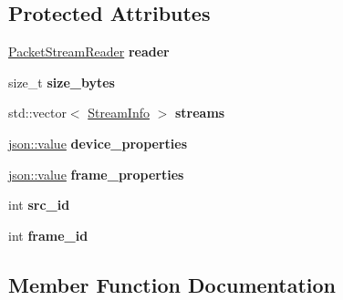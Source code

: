 \subsection*{Protected Attributes}
\begin{DoxyCompactItemize}
\item 
\hyperlink{classpangolin_1_1_packet_stream_reader}{Packet\+Stream\+Reader} {\bfseries reader}\hypertarget{classpangolin_1_1_pango_video_a1d6589328e5dcbb0a6bcf21ed6b7477c}{}\label{classpangolin_1_1_pango_video_a1d6589328e5dcbb0a6bcf21ed6b7477c}

\item 
size\+\_\+t {\bfseries size\+\_\+bytes}\hypertarget{classpangolin_1_1_pango_video_afd22d0fbd6f350e7e5f40eafc3e97801}{}\label{classpangolin_1_1_pango_video_afd22d0fbd6f350e7e5f40eafc3e97801}

\item 
std\+::vector$<$ \hyperlink{classpangolin_1_1_stream_info}{Stream\+Info} $>$ {\bfseries streams}\hypertarget{classpangolin_1_1_pango_video_a09ae4a03fc3ba838fb462727ee892a5e}{}\label{classpangolin_1_1_pango_video_a09ae4a03fc3ba838fb462727ee892a5e}

\item 
\hyperlink{classpangolin_1_1json_1_1value}{json\+::value} {\bfseries device\+\_\+properties}\hypertarget{classpangolin_1_1_pango_video_a560fdeab226aa558afa2257e04a81001}{}\label{classpangolin_1_1_pango_video_a560fdeab226aa558afa2257e04a81001}

\item 
\hyperlink{classpangolin_1_1json_1_1value}{json\+::value} {\bfseries frame\+\_\+properties}\hypertarget{classpangolin_1_1_pango_video_a7d2778cfb6a216ae9c264f51cd2e0474}{}\label{classpangolin_1_1_pango_video_a7d2778cfb6a216ae9c264f51cd2e0474}

\item 
int {\bfseries src\+\_\+id}\hypertarget{classpangolin_1_1_pango_video_a273b4bda5c65d99cd41a95b590cbb56d}{}\label{classpangolin_1_1_pango_video_a273b4bda5c65d99cd41a95b590cbb56d}

\item 
int {\bfseries frame\+\_\+id}\hypertarget{classpangolin_1_1_pango_video_aae49ceda3a0d883f9a8d4fcb1d80172e}{}\label{classpangolin_1_1_pango_video_aae49ceda3a0d883f9a8d4fcb1d80172e}

\end{DoxyCompactItemize}


\subsection{Member Function Documentation}
